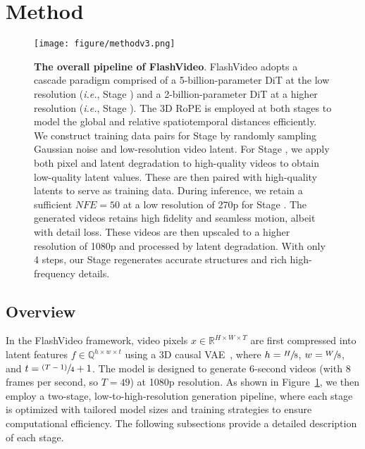

\section{Method}
\label{exp:method}

\begin{figure}[t]
\begin{center}
\texttt{[image: figure/methodv3.png]}
\end{center}
\caption{ \textbf{The overall pipeline of FlashVideo}. FlashVideo adopts a cascade paradigm comprised of a 5-billion-parameter DiT at the low resolution (\textit{i.e.}, Stage ) and a 2-billion-parameter DiT at a higher resolution (\textit{i.e.}, Stage ). The 3D RoPE is employed at both stages to model the global and relative spatiotemporal distances efficiently.  We construct training data pairs for Stage  by randomly sampling Gaussian noise and low-resolution video latent. For Stage , we apply both pixel and latent degradation to high-quality videos to obtain low-quality latent values. These are then paired with high-quality latents to serve as training data. During inference, we retain a sufficient $NFE=50$ at a low resolution of 270p  for Stage . The generated videos retains high fidelity and seamless motion, albeit with detail loss. These videos are then upscaled to a higher resolution of 1080p and processed by latent degradation. With only 4 steps, our Stage  regenerates accurate structures and rich high-frequency details.
}
\label{fig:method}
\end{figure}




\subsection{Overview}



In the FlashVideo framework, video pixels $x \in \mathbb{R}^{H \times W \times T}$ are first compressed into latent features $f \in \mathbb{Q}^{h \times w \times t}$ using a 3D causal VAE~\citep{cogvideox}, where $h = \sfrac{H}{8}$, $w = \sfrac{W}{8}$, and $t = \sfrac{(T - 1)}{4} + 1$. The model is designed to generate 6-second videos (with 8 frames per second, so \( T = 49 \)) at 1080p resolution. As shown in Figure~\ref{fig:method}, we then employ a two-stage, low-to-high-resolution generation pipeline, where each stage is optimized with tailored model sizes and training strategies to ensure computational efficiency. The following subsections provide a detailed description of each stage.


